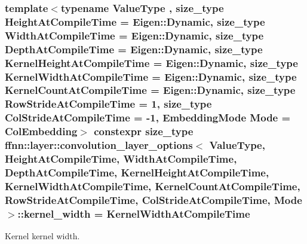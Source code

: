 \hypertarget{structffnn_1_1layer_1_1convolution__layer__options_a117ca045ad1ab24a5b80935c332d5001}{
\subsubsection[{kernel\-\_\-width}]{\setlength{\rightskip}{0pt plus 5cm}template$<$typename Value\-Type , size\-\_\-type Height\-At\-Compile\-Time = Eigen\-::\-Dynamic, size\-\_\-type Width\-At\-Compile\-Time = Eigen\-::\-Dynamic, size\-\_\-type Depth\-At\-Compile\-Time = Eigen\-::\-Dynamic, size\-\_\-type Kernel\-Height\-At\-Compile\-Time = Eigen\-::\-Dynamic, size\-\_\-type Kernel\-Width\-At\-Compile\-Time = Eigen\-::\-Dynamic, size\-\_\-type Kernel\-Count\-At\-Compile\-Time = Eigen\-::\-Dynamic, size\-\_\-type Row\-Stride\-At\-Compile\-Time = 1, size\-\_\-type Col\-Stride\-At\-Compile\-Time = -\/1, Embedding\-Mode Mode = Col\-Embedding$>$ constexpr {\bf size\-\_\-type} {\bf ffnn\-::layer\-::convolution\-\_\-layer\-\_\-options}$<$ Value\-Type, Height\-At\-Compile\-Time, Width\-At\-Compile\-Time, Depth\-At\-Compile\-Time, Kernel\-Height\-At\-Compile\-Time, Kernel\-Width\-At\-Compile\-Time, Kernel\-Count\-At\-Compile\-Time, Row\-Stride\-At\-Compile\-Time, Col\-Stride\-At\-Compile\-Time, Mode $>$\-::kernel\-\_\-width = Kernel\-Width\-At\-Compile\-Time\hspace{0.3cm}{\ttfamily [static]}}}\label{structffnn_1_1layer_1_1convolution__layer__options_a117ca045ad1ab24a5b80935c332d5001}


Kernel kernel width. 

